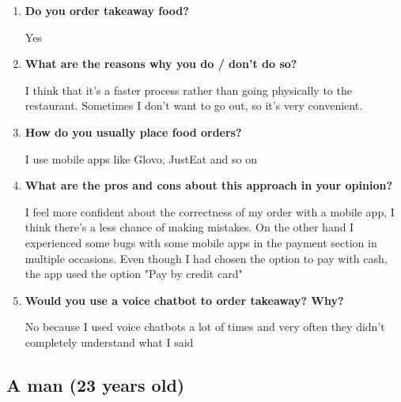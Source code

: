 \begin{enumerate}

\item \textbf{Do you order takeaway food?}

Yes

\item \textbf{What are the reasons why you do / don't do so?}

I think that it's a faster process rather than going physically to the restaurant. Sometimes I don't want to go out, so it's very convenient.

\item \textbf{How do you usually place food orders?}

I use mobile apps like Glovo, JustEat and so on

\item \textbf{What are the pros and cons about this approach in your opinion?}

I feel more confident about the correctness of my order with a mobile app, I think there's a less chance of making mistakes. On the other hand I experienced some bugs with some mobile apps in the payment section in multiple occasions. Even though I had chosen the option to pay with cash, the app used the option "Pay by credit card"

\item \textbf{Would you use a voice chatbot to order takeaway? Why?}

No because I used voice chatbots a lot of times and very often they didn't completely understand what I said

\end{enumerate}


\subsection*{A man (23 years old)}

